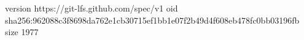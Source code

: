 version https://git-lfs.github.com/spec/v1
oid sha256:962088c3f8698da762e1cb30715ef1bb1e07f2b49d4f608eb478fc0bb03196fb
size 1977
